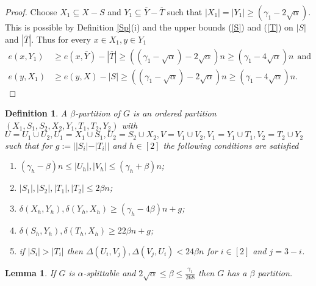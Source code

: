 \documentclass[oneside,12pt]{memoir}
\newtheorem{lemma}[theorem]{Lemma}
\newtheorem{definition}[theorem]{Definition}
\newcommand{\g}{\gamma}
\begin{document}
\begin{proof}
Choose $X_{1}\subseteq X-S$ and $Y_{1}\subseteq\overline{Y}-\overline{T}$
such that $\left\vert X_{1}\right\vert =\left\vert Y_{1}\right\vert \geq(\g_1-2\sqrt{\alpha})$.
This is possible by Definition \ref{Sp}(i) and the upper bounds (\ref{S}) and (\ref{T}) on $\left\vert S\right\vert $
and $\left\vert \overline{T}\right\vert $.
Thus for every $x\in X_{1},y\in Y_{1}$ 
\begin{align*}
e(x,Y_{1})&\geq e(x,\overline{Y})-\left\vert \overline{T}\right\vert \geq((\gamma_{1}-\sqrt{\alpha})-2\sqrt{\alpha})n\geq(\gamma_{1}-4\sqrt{\alpha})n ~~\text{and}\\
e(y,X_{1})&\geq e(y,X)-\left\vert S\right\vert \geq((\gamma_{1}-\sqrt{\alpha})-2\sqrt{\alpha})n\geq(\gamma_{1}-4\sqrt{\alpha})n.
\end{align*}
\end{proof}

\begin{definition} \label{Part}
A $\beta$-\emph{partition} of $G$ is an ordered partition $(X_{1},S_{1}, S_{2}, X_{2},Y_{1}, T_{1}, T_{2}, Y_{2})$ with $U=U_1\cup U_2, U_1=X_{1}\cup S_{1}, U_2= S_{2}\cup X_{2}, V=V_1\cup V_2, V_1=Y_{1}\cup T_{1},V_2= T_{2}\cup Y_{2}$  such that for $g:=||S_{i}|-|T_{i}||$ and $h\in [2]$ the following conditions are satisfied
\begin{enumerate}
\item $(\g_h-\beta)n\leq|U_h|,|V_h|\leq(\g_h+\beta)n$;
\item $|S_{1}|,|S_{2}|,|T_{1}|,|T_{2}|\leq2\beta n$;
\item $\delta(X_{h}, Y_{h}),\delta(Y_{h}, X_{h}) \geq(\gamma_{h}-4\beta)n+g$;
\item $\delta(S_{h},Y_{h}),\delta(T_{h},X_{h})\geq22\beta n+g$;
\item if $|S_{i}|>|T_{i}|$ 
then $\Delta(U_i,V_{j}),\Delta(V_{j},U_{i})<24\beta n$ for
$i\in [2]$ and $j=3-i$. 
\end{enumerate}
\end{definition}

\begin{lemma}\label{S2}
If $G$ is $\alpha$-splittable and $2\sqrt{\alpha}\leq\beta\leq\frac{\gamma_1}{268}$ then $G$ has a $\beta$ partition.
\end{lemma}
\end{document}
